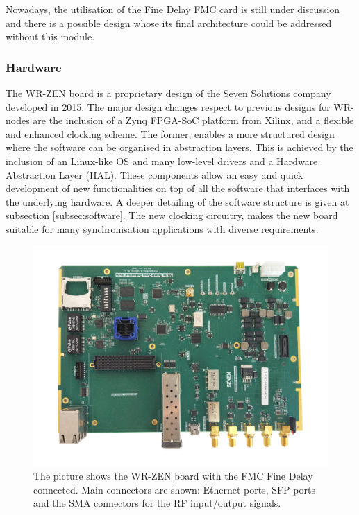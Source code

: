 Nowadays, the utilisation of the Fine Delay FMC card is still under discussion and there is a possible design whose its final architecture could be addressed without this module.

\subsubsection{Hardware}
\label{subsec:hardware}

The WR-ZEN board is a proprietary design of the Seven Solutions company 
developed in 2015. The major design changes respect to previous designs for 
WR-nodes are the inclusion of a Zynq FPGA-SoC platform from Xilinx, and a 
flexible and enhanced clocking scheme. The former, enables a more structured design where 
the software can be organised in abstraction layers. This is achieved by the 
inclusion of an Linux-like OS and many low-level drivers and a Hardware 
Abstraction Layer (HAL). These components allow an easy and quick 
development of new functionalities on top of all the software that interfaces 
with the underlying hardware. A deeper detailing of the software structure is 
given at subsection \ref{subsec:software}. The new clocking circuitry, makes the new board 
suitable for many synchronisation applications with diverse requirements.

\begin{figure}[H]
	\centering
	\includegraphics[width=0.7\linewidth]{img/wrzenv3_scaled}
	\caption[WR-ZEN board picture]{The picture shows the WR-ZEN board with the 
	FMC Fine Delay connected. Main connectors are shown: Ethernet ports, SFP 
	ports and the SMA connectors for the RF input/output signals.}
	\label{fig:wrzen}
\end{figure}

